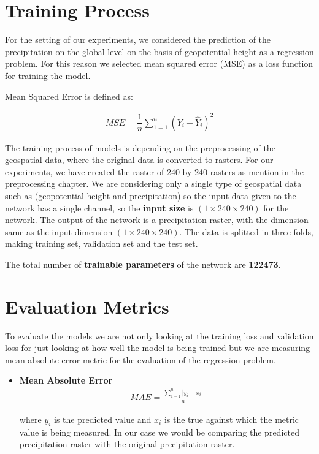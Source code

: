 \newpage

\section{Training Process}

For the setting of our experiments, we considered the prediction of the precipitation on the global level on the basis of geopotential height as a regression problem. For this reason we selected mean squared error (MSE) as a loss function for training the model.

Mean Squared Error is defined as:

\begin{gather*}
    MSE = \dfrac{1}{n}\sum_{1 = 1}^{n}(Y_i-\hat{Y}_i )^2
\end{gather*}

The training process of models is depending on the preprocessing of the geospatial data, where the original data is converted to rasters. For our experiments, we have created the raster of 240 by 240 rasters as mention in the preprocessing chapter.
We are considering only a single type of geospatial data such as (geopotential height and precipitation) so the input data given to the network has a single channel, so the \textbf{input size} is $(1 \times 240  \times 240)$ for the network.
The output of the network is a precipitation raster, with the dimension same as the input dimension $(1 \times 240  \times 240)$. The data is splitted in three folds, making training set, validation set and the test set.

The total number of \textbf{trainable parameters} of the network are \textbf{122473}.
\section{Evaluation Metrics}

To evaluate the models we are not only looking at the training loss and validation loss for just looking at how well the model is being trained but we are measuring mean absolute error metric for the evaluation of the regression problem.
\begin{itemize}
    \item \textbf{Mean Absolute Error}\\
          \begin{gather*}
              MAE = \frac{\sum_{1 = 1}^{n}\left\lvert
                  y_i - x_i
                  \right\rvert}{n}
          \end{gather*}

          where $y_i$ is the predicted value and $x_i$ is the true against which the metric value is being measured. In our case we would be comparing the predicted precipitation raster with the original precipitation raster.
\end{itemize}